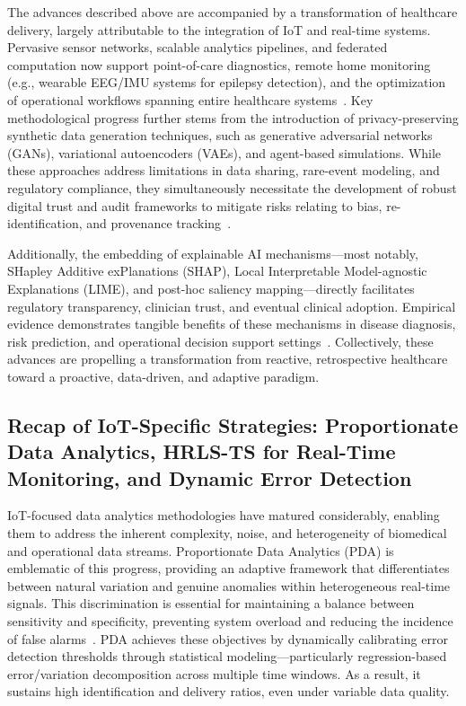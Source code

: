 The advances described above are accompanied by a transformation of healthcare delivery, largely attributable to the integration of IoT and real-time systems. Pervasive sensor networks, scalable analytics pipelines, and federated computation now support point-of-care diagnostics, remote home monitoring (e.g., wearable EEG/IMU systems for epilepsy detection), and the optimization of operational workflows spanning entire healthcare systems~\cite{ref24,ref27,ref106,ref107}. Key methodological progress further stems from the introduction of privacy-preserving synthetic data generation techniques, such as generative adversarial networks (GANs), variational autoencoders (VAEs), and agent-based simulations. While these approaches address limitations in data sharing, rare-event modeling, and regulatory compliance, they simultaneously necessitate the development of robust digital trust and audit frameworks to mitigate risks relating to bias, re-identification, and provenance tracking~\cite{ref51,ref94,ref95}.

Additionally, the embedding of explainable AI mechanisms---most notably, SHapley Additive exPlanations (SHAP), Local Interpretable Model-agnostic Explanations (LIME), and post-hoc saliency mapping---directly facilitates regulatory transparency, clinician trust, and eventual clinical adoption. Empirical evidence demonstrates tangible benefits of these mechanisms in disease diagnosis, risk prediction, and operational decision support settings~\cite{ref34,ref51,ref76,ref87,ref91}. Collectively, these advances are propelling a transformation from reactive, retrospective healthcare toward a proactive, data-driven, and adaptive paradigm.

\subsection{Recap of IoT-Specific Strategies: Proportionate Data Analytics, HRLS-TS for Real-Time Monitoring, and Dynamic Error Detection}

IoT-focused data analytics methodologies have matured considerably, enabling them to address the inherent complexity, noise, and heterogeneity of biomedical and operational data streams. Proportionate Data Analytics (PDA) is emblematic of this progress, providing an adaptive framework that differentiates between natural variation and genuine anomalies within heterogeneous real-time signals. This discrimination is essential for maintaining a balance between sensitivity and specificity, preventing system overload and reducing the incidence of false alarms~\cite{ref106}. PDA achieves these objectives by dynamically calibrating error detection thresholds through statistical modeling---particularly regression-based error/variation decomposition across multiple time windows. As a result, it sustains high identification and delivery ratios, even under variable data quality.

